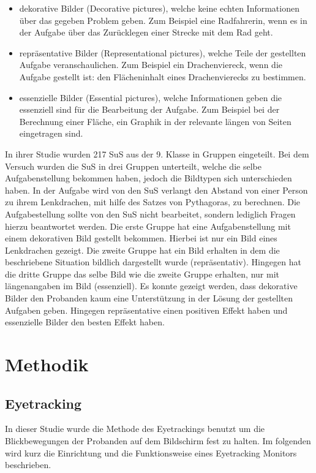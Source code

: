     \begin{itemize}
        \item dekorative Bilder (Decorative pictures), welche keine echten Informationen über das gegeben Problem geben. Zum Beispiel eine Radfahrerin, wenn es in der Aufgabe über das Zurücklegen einer Strecke mit dem Rad geht.
        \item repräsentative Bilder (Representational pictures), welche Teile der gestellten Aufgabe veranschaulichen. Zum Beispiel ein Drachenviereck, wenn die Aufgabe gestellt ist: den Flächeninhalt eines Drachenvierecks zu bestimmen. 
        \item essenzielle Bilder (Essential pictures), welche Informationen geben die essenziell sind für die Bearbeitung der Aufgabe. Zum Beispiel bei der Berechnung einer Fläche, ein Graphik in der relevante längen von Seiten eingetragen sind.
    \end{itemize}

In ihrer Studie wurden 217 SuS aus der 9. Klasse in Gruppen eingeteilt. Bei dem Versuch wurden die SuS in drei Gruppen unterteilt, welche die selbe Aufgabenstellung bekommen haben, jedoch die Bildtypen sich unterschieden haben. In der Aufgabe wird von den SuS verlangt den Abstand von einer Person zu ihrem Lenkdrachen, mit hilfe des Satzes von Pythagoras, zu berechnen. Die Aufgabestellung sollte von den SuS nicht bearbeitet, sondern lediglich Fragen hierzu beantwortet werden. 
Die erste Gruppe hat eine Aufgabenstellung mit einem dekorativen Bild gestellt bekommen. Hierbei ist nur ein Bild eines Lenkdrachen gezeigt.
Die zweite Gruppe hat ein Bild erhalten in dem die beschriebene Situation bildlich dargestellt wurde (repräsentativ). Hingegen hat die dritte Gruppe das selbe Bild wie die zweite Gruppe erhalten, nur mit längenangaben im Bild (essenziell).
Es konnte gezeigt werden, dass dekorative Bilder den Probanden kaum eine Unterstützung in der Lösung der gestellten Aufgaben geben. Hingegen repräsentative einen positiven Effekt haben und essenzielle Bilder den besten Effekt haben.%

\chapter{Methodik}

\section{Eyetracking}

In dieser Studie wurde die Methode des Eyetrackings benutzt um die Blickbewegungen der Probanden auf dem Bildschirm fest zu halten. Im folgenden wird kurz die Einrichtung und die Funktionsweise eines Eyetracking Monitors beschrieben. 

